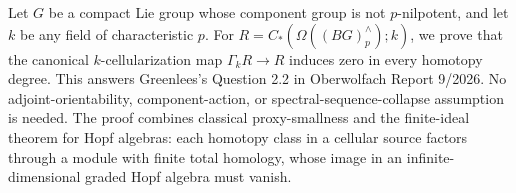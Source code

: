
Let \(G\) be a compact Lie group whose component group is not \(p\)-nilpotent, and let \(k\) be any field of characteristic \(p\). For \(R=C_*(\Omega((BG)^\wedge_p);k)\), we prove that the canonical \(k\)-cellularization map \(\Gamma_kR\to R\) induces zero in every homotopy degree. This answers Greenlees's Question 2.2 in Oberwolfach Report 9/2026. No adjoint-orientability, component-action, or spectral-sequence-collapse assumption is needed. The proof combines classical proxy-smallness and the finite-ideal theorem for Hopf algebras: each homotopy class in a cellular source factors through a module with finite total homology, whose image in an infinite-dimensional graded Hopf algebra must vanish.
